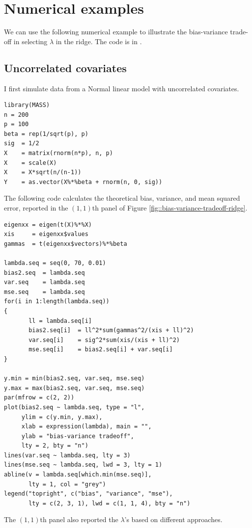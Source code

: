  


\section{Numerical examples}

We can use the following numerical example to illustrate the bias-variance trade-off in selecting $\lambda$ in the ridge. The code is in . 



\subsection{Uncorrelated covariates}
 I first simulate data from a Normal linear model with uncorrelated covariates. 
\begin{lstlisting}
library(MASS)
n = 200
p = 100
beta = rep(1/sqrt(p), p) 
sig  = 1/2
X    = matrix(rnorm(n*p), n, p)
X    = scale(X)
X    = X*sqrt(n/(n-1))
Y    = as.vector(X%*%beta + rnorm(n, 0, sig))
\end{lstlisting}


The following code calculates the theoretical bias, variance, and mean squared error, reported in the $(1,1)$th panel of Figure \ref{fig::bias-variance-tradeoff-ridge}.  
 
\begin{lstlisting}
eigenxx = eigen(t(X)%*%X)
xis     = eigenxx$values
gammas  = t(eigenxx$vectors)%*%beta

lambda.seq = seq(0, 70, 0.01)
bias2.seq  = lambda.seq
var.seq    = lambda.seq
mse.seq    = lambda.seq
for(i in 1:length(lambda.seq))
{
	   ll = lambda.seq[i]
	   bias2.seq[i]  = ll^2*sum(gammas^2/(xis + ll)^2)
	   var.seq[i]    = sig^2*sum(xis/(xis + ll)^2)
	   mse.seq[i]    = bias2.seq[i] + var.seq[i]
}
 
y.min = min(bias2.seq, var.seq, mse.seq)
y.max = max(bias2.seq, var.seq, mse.seq)
par(mfrow = c(2, 2))
plot(bias2.seq ~ lambda.seq, type = "l",
     ylim = c(y.min, y.max), 
     xlab = expression(lambda), main = "", 
     ylab = "bias-variance tradeoff", 
     lty = 2, bty = "n")
lines(var.seq ~ lambda.seq, lty = 3)
lines(mse.seq ~ lambda.seq, lwd = 3, lty = 1)
abline(v = lambda.seq[which.min(mse.seq)], 
       lty = 1, col = "grey")
legend("topright", c("bias", "variance", "mse"),
       lty = c(2, 3, 1), lwd = c(1, 1, 4), bty = "n")
\end{lstlisting}


The  $(1,1)$th panel also reported the $\lambda$'s based on different approaches. 

